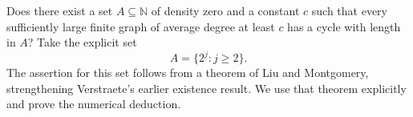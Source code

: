 Does there exist a set $A\subseteq\mathbb N$ of density zero and a
constant $c$ such that every sufficiently large finite graph of
average degree at least $c$ has a cycle with length in $A$?
Take the explicit set
\[
 A=\{2^j:j\geq2\}.
\]
The assertion for this set follows from a theorem of Liu and
Montgomery, strengthening Verstraete's earlier existence result.
We use that theorem explicitly and prove the numerical deduction.
